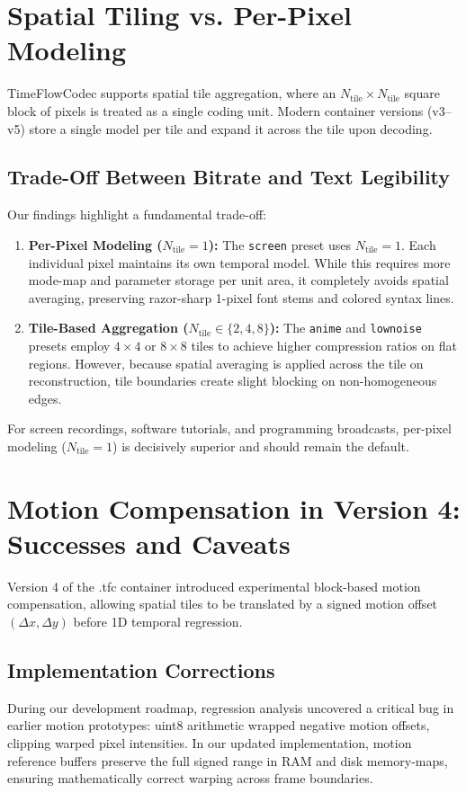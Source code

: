 \section{Spatial Tiling vs. Per-Pixel Modeling}
TimeFlowCodec supports spatial tile aggregation, where an $N_{\text{tile}} \times N_{\text{tile}}$ square block of pixels is treated as a single coding unit. Modern container versions (v3--v5) store a single model per tile and expand it across the tile upon decoding.

\subsection{Trade-Off Between Bitrate and Text Legibility}
Our findings highlight a fundamental trade-off:
\begin{enumerate}
    \item \textbf{Per-Pixel Modeling ($N_{\text{tile}} = 1$):} The \texttt{screen} preset uses $N_{\text{tile}} = 1$. Each individual pixel maintains its own temporal model. While this requires more mode-map and parameter storage per unit area, it completely avoids spatial averaging, preserving razor-sharp 1-pixel font stems and colored syntax lines.
    \item \textbf{Tile-Based Aggregation ($N_{\text{tile}} \in \{2, 4, 8\}$):} The \texttt{anime} and \texttt{lownoise} presets employ $4 \times 4$ or $8 \times 8$ tiles to achieve higher compression ratios on flat regions. However, because spatial averaging is applied across the tile on reconstruction, tile boundaries create slight blocking on non-homogeneous edges.
\end{enumerate}
For screen recordings, software tutorials, and programming broadcasts, per-pixel modeling ($N_{\text{tile}} = 1$) is decisively superior and should remain the default.

\section{Motion Compensation in Version 4: Successes and Caveats}
Version 4 of the .tfc container introduced experimental block-based motion compensation, allowing spatial tiles to be translated by a signed motion offset $(\Delta x, \Delta y)$ before 1D temporal regression.

\subsection{Implementation Corrections}
During our development roadmap, regression analysis uncovered a critical bug in earlier motion prototypes: uint8 arithmetic wrapped negative motion offsets, clipping warped pixel intensities. In our updated implementation, motion reference buffers preserve the full signed range in RAM and disk memory-maps, ensuring mathematically correct warping across frame boundaries.

